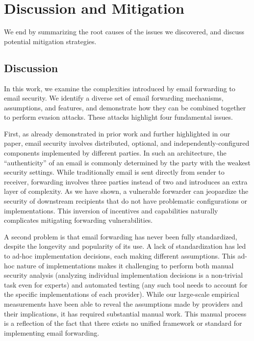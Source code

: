 \section{Discussion and Mitigation}
We end by summarizing the root causes of the issues we discovered, and discuss potential mitigation strategies.

\subsection{Discussion}
In this work, we examine the complexities introduced by email forwarding to email security. We identify a diverse set of email forwarding mechanisms, assumptions, and features, and demonstrate how they can be combined together to perform evasion attacks. These attacks highlight four fundamental issues.

First, as already demonstrated in prior work and further highlighted in our paper, email security involves distributed, optional, and independently-configured components implemented by different parties. In such an architecture, the
``authenticity'' of an email is commonly determined by the party with the weakest security settings. While traditionally email is sent directly from sender to receiver, forwarding involves three parties instead of two and introduces an extra layer of complexity. As we have shown, a vulnerable forwarder can jeopardize the security of downstream recipients that do not have problematic configurations or implementations. This inversion of
incentives and capabilities naturally complicates
mitigating forwarding vulnerabilities.

A second problem is that email forwarding has never been fully standardized, despite the longevity and popularity of its use. A lack of standardization has led to ad-hoc implementation decisions, each making different assumptions.
This ad-hoc nature of implementations makes it challenging to perform both manual security analysis (analyzing individual implementation decisions is a non-trivial task even for experts) and automated testing (any such tool needs to account for the specific implementations of each provider).
While our large-scale empirical measurements have been able to reveal
the assumptions made by providers and their implications, it has
required substantial manual work.  This manual process is a reflection
of the fact that there exists no unified framework or standard for
implementing email forwarding.


